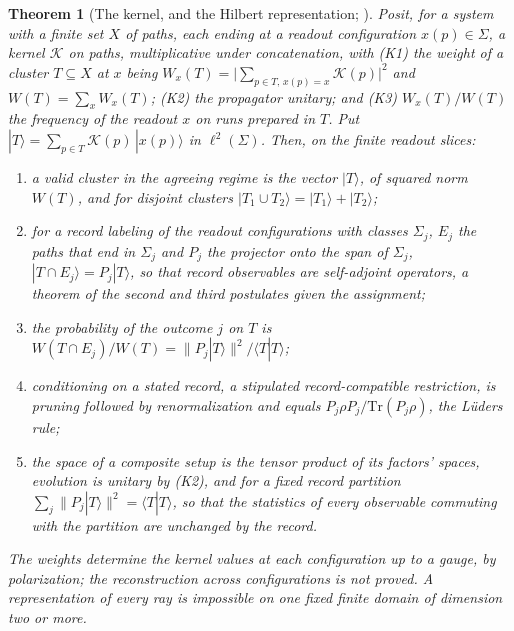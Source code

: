 \documentclass[11pt]{article}
\newtheorem{theorem}{Theorem}
\theoremstyle{definition}
\begin{document}
\begin{theorem}[The kernel, and the Hilbert representation; \cite{AethusQuant}]\label{thm:core_kernel}
Posit, for a system with a finite set $X$ of paths, each ending at a readout configuration $x(p) \in \Sigma$, a kernel $\mathcal{K}$ on paths, multiplicative under concatenation, with (K1) the weight of a cluster $T \subseteq X$ at $x$ being $W_x(T) = \bigl|\sum_{p \in T,\, x(p) = x} \mathcal{K}(p)\bigr|^{2}$ and $W(T) = \sum_x W_x(T)$; (K2) the propagator unitary; and (K3) $W_x(T)/W(T)$ the frequency of the readout $x$ on runs prepared in $T$. Put $|T\rangle = \sum_{p \in T} \mathcal{K}(p)\,|x(p)\rangle$ in $\ell^{2}(\Sigma)$. Then, on the finite readout slices:
\begin{enumerate}
\item[(i)] a valid cluster in the agreeing regime is the vector $|T\rangle$, of squared norm $W(T)$, and for disjoint clusters $|T_1 \cup T_2\rangle = |T_1\rangle + |T_2\rangle$;
\item[(ii)] for a record labeling of the readout configurations with classes $\Sigma_j$, $E_j$ the paths that end in $\Sigma_j$ and $P_j$ the projector onto the span of $\Sigma_j$, $|T \cap E_j\rangle = P_j |T\rangle$, so that record observables are self-adjoint operators, a theorem of the second and third postulates given the assignment;
\item[(iii)] the probability of the outcome $j$ on $T$ is $W(T \cap E_j)/W(T) = \lVert P_j |T\rangle \rVert^{2}/\langle T | T \rangle$;
\item[(iv)] conditioning on a stated record, a stipulated record-compatible restriction, is pruning followed by renormalization and equals $P_j \rho P_j / \mathrm{Tr}(P_j \rho)$, the L\"uders rule;
\item[(v)] the space of a composite setup is the tensor product of its factors' spaces, evolution is unitary by (K2), and for a fixed record partition $\sum_j \lVert P_j |T\rangle \rVert^{2} = \langle T | T \rangle$, so that the statistics of every observable commuting with the partition are unchanged by the record.
\end{enumerate}
The weights determine the kernel values at each configuration up to a gauge, by polarization; the reconstruction across configurations is not proved. A representation of every ray is impossible on one fixed finite domain of dimension two or more.
\end{theorem}
\end{document}
